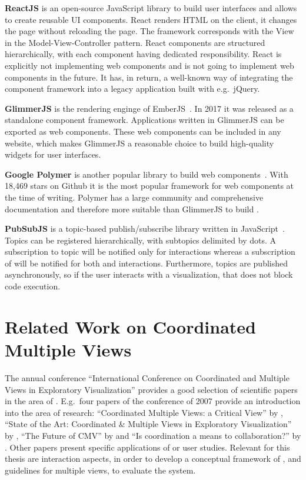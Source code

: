 \textbf{ReactJS} is an open-source JavaScript library to build user interfaces and allows to create reusable UI components.
React renders HTML on the client, it changes the page without reloading the page.
The framework corresponds with the View in the Model-View-Controller pattern.
React components are structured hierarchically, with each component having dedicated responsibility.
React is explicitly not implementing web components and is not going to implement web components in the future.
It has, in return, a well-known way of integrating the component framework into a legacy application built with e.g.\ jQuery.

\textbf{GlimmerJS} is the rendering enginge of EmberJS~\parencite{Glimmer2017}.
In 2017 it was released as a standalone component framework.
Applications written in GlimmerJS can be exported as web components.
These web components can be included in any website, which makes GlimmerJS a reasonable choice to build high-quality widgets for user interfaces.

\textbf{Google Polymer} is another popular library to build web components~\parencite{Polymer2017}.
With 18,469 stars on Github it is the most popular framework for web components at the time of writing.
Polymer has a large community and comprehensive documentation and therefore more suitable than GlimmerJS to build \cmvs{}.


\textbf{PubSubJS} is a topic-based publish/subscribe library written in JavaScript~\parencite{PubSubJS2017}.
Topics can be registered hierarchically, with subtopics delimited by dots.
A subscription to topic  will be notified only for  interactions whereas a subscription of  will be notified for both  and  interactions.
Furthermore, topics are published asynchronously, so if the user interacts with a visualization, that does not block code execution.


\section{Related Work on Coordinated Multiple Views}\label{sec:related-work:guidelines}
The annual conference ``International Conference on Coordinated and Multiple Views in Exploratory Visualization'' provides a good selection of scientific papers in the area of \cmvs{}.
E.g.\ four papers of the conference of 2007 provide an introduction into the area of research:
``Coordinated Multiple Views: a Critical View'' by \textcite{Andrienko2007},
``State of the Art: Coordinated \& Multiple Views in Exploratory Visualization'' by \textcite{Roberts2007},
``The Future of CMV'' by \textcite{Erbacher2007} and
``Is coordination a means to collaboration?'' by \textcite{Weaver2007}.
Other papers present specific applications of \cmvs{} or user studies.
Relevant for this thesis are interaction aspects, in order to develop a conceptual framework of \cmvs{}, and guidelines for multiple views, to evaluate the system.

